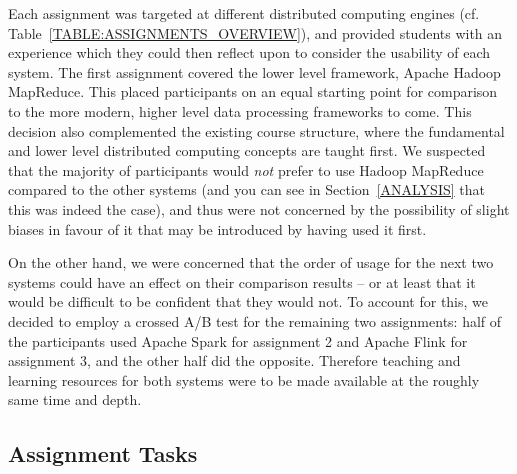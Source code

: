   Each assignment was targeted at different distributed computing engines (cf. Table~\ref{TABLE:ASSIGNMENTS_OVERVIEW}), and provided students with an experience which they could then reflect upon to consider the usability of each system. The first assignment covered the lower level framework, Apache Hadoop MapReduce. This placed participants on an equal starting point for comparison to the more modern, higher level data processing frameworks to come. This decision also complemented the existing course structure, where the fundamental and lower level distributed computing concepts are taught first. We suspected that the majority of participants would \emph{not} prefer to use Hadoop MapReduce compared to the other systems (and you can see in Section~\ref{ANALYSIS} that this was indeed the case), and thus were not concerned by the possibility of slight biases in favour of it that may be introduced by having used it first.

  On the other hand, we were concerned that the order of usage for the next two systems could have an effect on their comparison results -- or at least that it would be difficult to be confident that they would not. To account for this, we decided to employ a crossed A/B test for the remaining two assignments: half of the participants used Apache Spark for assignment 2 and Apache Flink for assignment 3, and the other half did the opposite. Therefore teaching and learning resources for both systems were to be made available at the roughly same time and depth.


\subsection{Assignment Tasks}

  \begin{table}[ht]
    \scriptsize
    \centering
    \setlength\tabcolsep{3pt}
    
    \caption{Overview on programming tasks used in study.}
    \label{TABLE:ASSIGNMENTS_OVERVIEW}

  \end{table}

